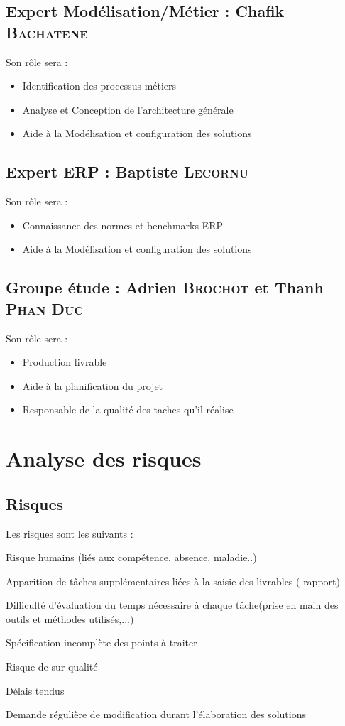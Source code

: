 \subsection{Expert Modélisation/Métier : Chafik \textsc{Bachatene}}

Son rôle sera :
\begin{itemize}
    \item Identification des processus métiers
    \item Analyse et Conception de l’architecture générale
    \item Aide à la Modélisation et configuration des solutions 
\end{itemize}

\subsection{Expert ERP : Baptiste \textsc{Lecornu}}

Son rôle sera :
\begin{itemize}
    \item Connaissance des normes et benchmarks ERP
    \item Aide à la Modélisation et configuration des solutions 
\end{itemize}

\subsection{Groupe étude : Adrien \textsc{Brochot} et Thanh \textsc{Phan Duc}}

Son rôle sera :
\begin{itemize}
    \item Production livrable
    \item Aide à la planification du projet
    \item Responsable de la qualité des taches qu’il réalise
\end{itemize}


\section{Analyse des risques}
\subsection{Risques}

\setcounter{risques}{0}

\newcommand{\risque}[1]{
    \addtocounter{risques}{1}
    \item[R\therisques]{\indent#1}
}
Les risques sont les suivants :
\begin{description}
    \risque{Risque humains (liés aux compétence, absence, maladie..)}
    \risque{Apparition de tâches supplémentaires liées à la saisie des livrables ( rapport)}
    \risque{Difficulté d’évaluation du temps nécessaire à chaque tâche(prise en main des outils et méthodes utilisés,...)}
    \risque{Spécification incomplète des points à traiter}
    \risque{Risque de sur-qualité}
    \risque{Délais tendus}
    \risque{Demande régulière de modification durant l’élaboration des solutions}
\end{description}

